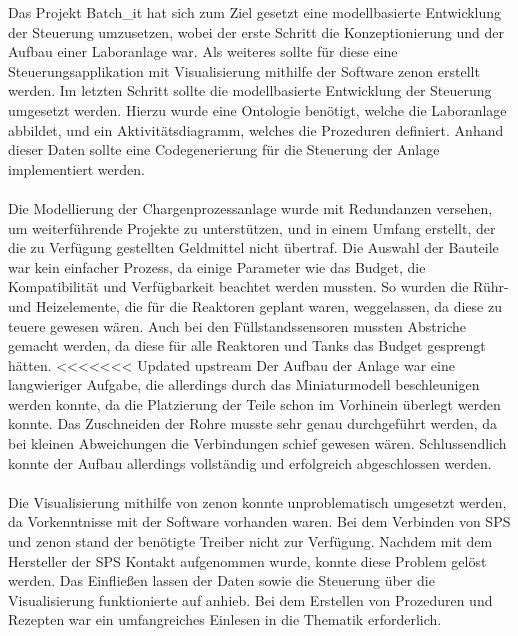 Das Projekt Batch\_it hat sich zum Ziel gesetzt eine modellbasierte Entwicklung der Steuerung umzusetzen, wobei der erste Schritt die Konzeptionierung und der Aufbau einer Laboranlage war. Als weiteres sollte für diese eine Steuerungsapplikation mit Visualisierung mithilfe der Software zenon erstellt werden. Im letzten Schritt sollte die modellbasierte Entwicklung der Steuerung umgesetzt werden. Hierzu wurde eine Ontologie benötigt, welche die Laboranlage abbildet, und ein Aktivitätsdiagramm, welches die Prozeduren definiert. Anhand dieser Daten sollte eine Codegenerierung für die Steuerung der Anlage implementiert werden. \\\\
Die Modellierung der Chargenprozessanlage wurde mit Redundanzen versehen, um weiterführende Projekte zu unterstützen, und in einem Umfang erstellt, der die zu Verfügung gestellten Geldmittel nicht übertraf. 
Die Auswahl der Bauteile war kein einfacher Prozess, da einige Parameter wie das Budget, die Kompatibilität und Verfügbarkeit beachtet werden mussten. So wurden die Rühr- und Heizelemente, die für die Reaktoren geplant waren, weggelassen, da diese zu teuere gewesen wären. Auch bei den Füllstandssensoren mussten Abstriche gemacht werden, da diese für alle Reaktoren und Tanks das Budget gesprengt hätten.
<<<<<<< Updated upstream
Der Aufbau der Anlage war eine langwieriger Aufgabe, die allerdings durch das Miniaturmodell beschleunigen werden konnte, da die Platzierung der Teile schon im Vorhinein überlegt werden konnte. Das Zuschneiden der Rohre musste sehr genau durchgeführt werden, da bei kleinen Abweichungen die Verbindungen schief gewesen wären. Schlussendlich konnte der Aufbau allerdings vollständig und erfolgreich abgeschlossen werden. \\\\
Die Visualisierung mithilfe von zenon konnte unproblematisch umgesetzt werden, da Vorkenntnisse mit der Software vorhanden waren. Bei dem Verbinden von SPS und zenon stand der benötigte Treiber nicht zur Verfügung. Nachdem mit dem Hersteller der SPS Kontakt aufgenommen wurde, konnte diese Problem gelöst werden. Das Einfließen lassen der Daten sowie die Steuerung über die Visualisierung funktionierte auf anhieb. Bei dem Erstellen von Prozeduren und Rezepten war ein umfangreiches Einlesen in die Thematik erforderlich.\\\\
